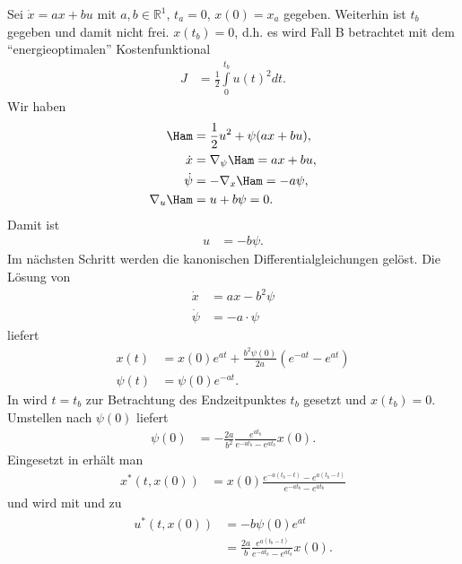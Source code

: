 \begin{exmp}\label{exmp:kap_2_vor_optlsg_1}
Sei $\dot{x}=ax+bu$ mit $a,b\in\mathbb{R}^1$, $t_a=0$, $x(0)=x_a$ gegeben. Weiterhin ist $t_b$ gegeben und damit nicht frei. $x(t_b)=0$, d.h. es
wird Fall B betrachtet mit dem "`energieoptimalen"' Kostenfunktional 
\begin{align*}
	J & = \frac12\int\limits_0^{t_b}u(t)^2dt.
\end{align*}
Wir haben
\begin{align*}
	\Ham & = \frac12 u^2 + \psi(ax+bu),\\
	\dot{x} & = \nabla_{\psi}\Ham = ax+bu,\\
	\dot{\psi} & = -\nabla_x\Ham = -a \psi,\\
	\nabla_u\Ham & = u+b\psi = 0.
\end{align*}
Damit ist 
\begin{align}
	u & = -b\psi.	\label{eqn:kap_2_vor_optlsg_u}
\end{align}
Im nächsten Schritt werden die kanonischen Differentialgleichungen gelöst. Die Lösung von 
\begin{align*}
	\dot{x} & = ax - b^2\psi\\
	\dot{\psi} & = -a\cdot\psi
\end{align*}
liefert
\begin{align}
	x(t) & = x(0)e^{at}+\frac{b^2\psi(0)}{2a}\left(e^{-at}-e^{at} \right)	\label{eqn:kap_2_vor_optlsg_x}\\
	\psi(t) & = \psi(0)e^{-at}.		\label{eqn:kap_2_vor_optlsg_psi}
\end{align}
In  wird $t=t_b$ zur Betrachtung des Endzeitpunktes $t_b$ gesetzt und $x(t_b)= 0$. Umstellen nach $\psi(0)$ liefert
\begin{align}
	\psi(0) & = -\frac{2a}{b^2}\frac{e^{at_b}}{e^{-at_b}-e^{at_b}}x(0).	\label{eqn:kap_2_vor_optlsg_psi0}
\end{align}
Eingesetzt in  erhält man
\begin{align}
	x^{\ast}(t,x(0)) & = x(0)\frac{e^{-a(t_b-t)}-e^{a(t_b-t)}}{e^{-at_b}-e^{at_b}}	\label{eqn:kap_2_vor_optlsg_xast}
\end{align}
und  wird mit  und  zu
\begin{align}
\begin{split}\label{eqn:kap_2_vor_optlsg_uast}
	u^{\ast}(t,x(0)) & = -b\psi(0)e^{at}\\
	& = \frac{2a}{b}\frac{e^{a(t_b-t)}}{e^{-at_b}-e^{at_b}} x(0).

\end{split}
\end{align}
\end{exmp}
